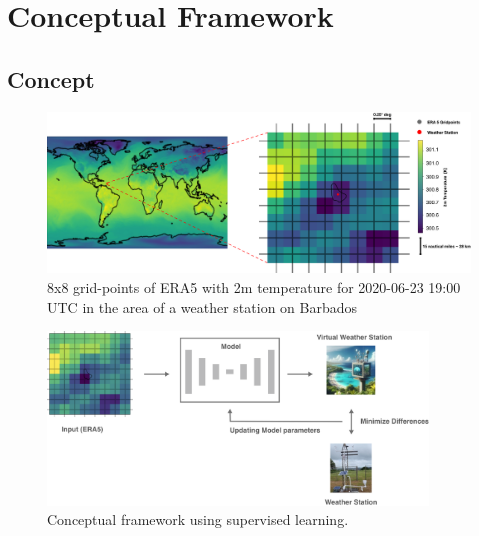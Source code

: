 \section{Conceptual Framework}
\label{sec: design}

\subsection{Concept}

\begin{figure}
    \centering
    \includegraphics[width=\textwidth]{resources/images/ERA5_tas_around_barbados.png}
    \caption{8x8 grid-points of ERA5 with 2m temperature 
    for 2020-06-23 19:00 UTC  in the area of a weather station on Barbados}    
    \label{fig: barbados}
\end{figure}

\begin{figure}
    \centering
    \includegraphics[width=0.9\textwidth]{resources/images/supervised_learning.png}
    \caption{Conceptual framework using supervised learning.}
    \label{fig: supervised_learning}
\end{figure}

